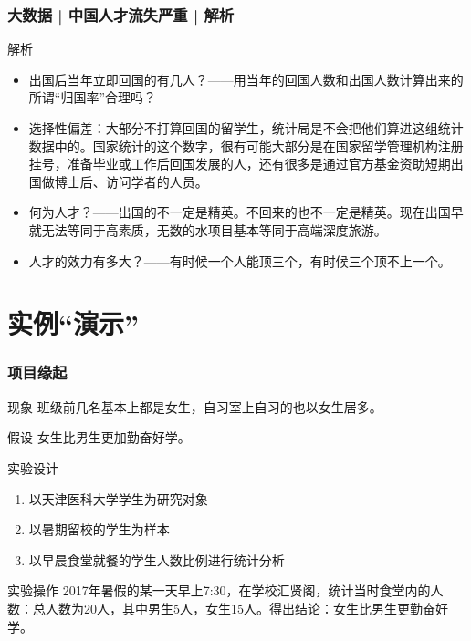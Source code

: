 \begin{frame}
  \frametitle{大数据 | 中国人才流失严重 | 解析}
  \begin{block}{解析}
    \begin{itemize}
      \item 出国后当年立即回国的有几人？——用当年的回国人数和出国人数计算出来的所谓“归国率”合理吗？
      \item 选择性偏差：大部分不打算回国的留学生，统计局是不会把他们算进这组统计数据中的。国家统计的这个数字，很有可能大部分是在国家留学管理机构注册挂号，准备毕业或工作后回国发展的人，还有很多是通过官方基金资助短期出国做博士后、访问学者的人员。
      \item 何为人才？——出国的不一定是精英。不回来的也不一定是精英。现在出国早就无法等同于高素质，无数的水项目基本等同于高端深度旅游。
      \item 人才的效力有多大？——有时候一个人能顶三个，有时候三个顶不上一个。
    \end{itemize}
  \end{block}
\end{frame}

\section{实例“演示”}
\begin{frame}
  \frametitle{项目缘起}
  \begin{block}{现象}
    班级前几名基本上都是女生，自习室上自习的也以女生居多。
  \end{block}
  \vspace{-0.5em}
  \pause
  \begin{block}{假设}
    女生比男生更加勤奋好学。
  \end{block}
  \pause
  \begin{block}{实验设计}
    \begin{enumerate}[<+->]
      \item 以天津医科大学学生为研究对象
      \item 以暑期留校的学生为样本
      \item 以早晨食堂就餐的学生人数比例进行统计分析
    \end{enumerate}
  \end{block}
  \vspace{-0.5em}
  \pause
  \begin{block}{实验操作}
    2017年暑假的某一天早上7:30，在学校汇贤阁，统计当时食堂内的人数：总人数为20人，其中男生5人，女生15人。得出结论：女生比男生更勤奋好学。
  \end{block}
\end{frame}

